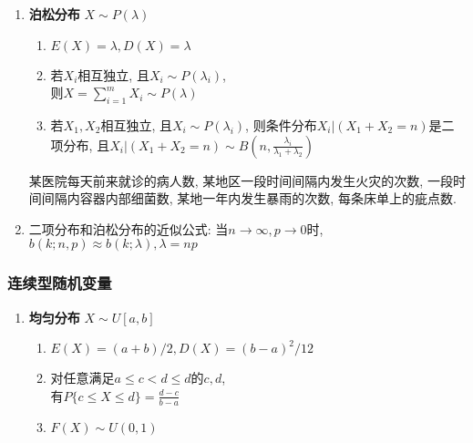 \documentclass[10pt,a4paper,nofonts]{ctexart}
\newcommand{\D}{\displaystyle}
\begin{document}
\begin{multicols}{2}
\begin{enumerate}
\item {\bf 泊松分布} $X\sim P(\lambda)$\\
\fbox{$\D b(k;\lambda)=P\{X=k\}=\frac{\lambda^k}{k!}e^{-\lambda}$}
\begin{enumerate}[label={\sf 性质\arabic*}]
\item $E(X)=\lambda, D(X)=\lambda$
\item 若$X_i$相互独立, 且$X_i\sim P(\lambda_i)$, \\则$X=\sum_{i=1}^{m}X_i\sim P(\lambda)$
\item 若$X_1, X_2$相互独立, 且$X_i\sim P(\lambda_i)$, 则条件分布$X_i|(X_1+X_2=n)$是二项分布, 且$X_i|(X_1+X_2=n)\sim B(n, \frac{\lambda_i}{\lambda_1+\lambda_2})$
\end{enumerate}
某医院每天前来就诊的病人数, 某地区一段时间间隔内发生火灾的次数, 一段时间间隔内容器内部细菌数, 某地一年内发生暴雨的次数, 每条床单上的疵点数.

\item 二项分布和泊松分布的近似公式: 当$n\to\infty, p\to0$时, $b(k;n,p)\approx b(k;\lambda), \lambda=np$

\end{enumerate}

\subsubsection*{连续型随机变量}

\begin{enumerate}
\item {\bf 均匀分布} $X\sim U[a,b ]$\\
\begin{enumerate}[label={\sf 性质\arabic*}]
\item $\D E(X)={(a+b)}/{2}, D(X)={(b-a)^2}/{12}$
\item 对任意满足$a\le c<d\le d$的$c, d$, \\有$P\{c\le X\le d\}=\D\frac{d-c}{b-a}$
\item $F(X)\sim U(0,1)$
\end{enumerate}


\end{enumerate}
\end{multicols}
\end{document}
